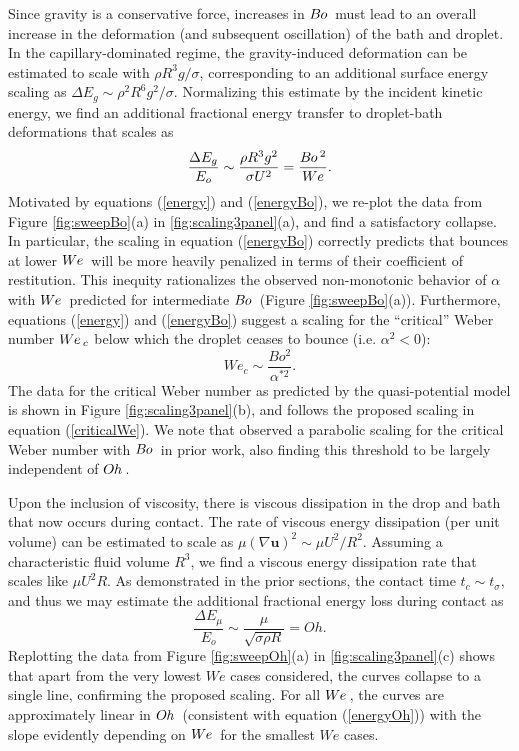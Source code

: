\documentclass{jfm}
\begin{document}
Since gravity is a conservative force, increases in $B\kern-0.04em o\,$ must lead to an overall increase in the deformation (and subsequent oscillation) of the bath and droplet.  In the capillary-dominated regime, the gravity-induced deformation can be estimated to scale with $\rho R^3 g/\sigma$, corresponding to an additional surface energy scaling as $\Delta E_g \sim \rho^2 R^6 g^2 / \sigma$.  Normalizing this estimate by the incident kinetic energy, we find an additional fractional energy transfer to droplet-bath deformations that scales as
\begin{equation}
    \frac{\Delta E_g}{E_o} \sim \frac{\rho R^3 g^2}{\sigma U^2}=\frac{B\kern-0.04em o\,^2}{We}.\label{energyBo}
\end{equation}
Motivated by equations (\ref{energy}) and (\ref{energyBo}), we re-plot the data from Figure \ref{fig:sweepBo}(a) in \ref{fig:scaling3panel}(a), and find a satisfactory collapse.  In particular, the scaling in equation (\ref{energyBo}) correctly predicts that bounces at lower $W\kern-0.03em e\,$ will be more heavily penalized in terms of their coefficient of restitution.  This inequity rationalizes the observed non-monotonic behavior of $\alpha$ with $W\kern-0.03em e\,$ predicted for intermediate $B\kern-0.04em o\,$ (Figure \ref{fig:sweepBo}(a)).
Furthermore, equations (\ref{energy}) and (\ref{energyBo}) suggest a scaling for the ``critical'' Weber number $W\kern-0.03em e\,_c$ below which the droplet ceases to bounce (i.e. $\alpha^2<0$):
\begin{equation}
    We_c \sim \frac{Bo^2}{\alpha^{*2}}.\label{criticalWe}
\end{equation}
The data for the critical Weber number as predicted by the quasi-potential model is shown in Figure \ref{fig:scaling3panel}(b), and follows the proposed scaling in equation (\ref{criticalWe}).  We note that \cite{blanchette2016modeling} observed a parabolic scaling for the critical Weber number with $B\kern-0.04em o\,$ in prior work, also finding this threshold to be largely independent of $O\kern-0.04em h\,$.

Upon the inclusion of viscosity, there is viscous dissipation in the drop and bath that now occurs during contact.  The rate of viscous energy dissipation (per unit volume) can be estimated to scale as $\mu (\nabla \mathbf{u})^2\sim \mu U^2 / R^2$.  Assuming a characteristic fluid volume $R^3$, we find a viscous energy dissipation rate that scales like $ \mu U^2 R$.  As demonstrated in the prior sections, the contact time $t_c \sim t_\sigma$, and thus we may estimate the additional fractional energy loss during contact as
\begin{equation}
    \frac{\Delta E_\mu}{E_o} \sim \frac{\mu}{\sqrt{\sigma \rho R}}=Oh.\label{energyOh}
\end{equation}
Replotting the data from Figure \ref{fig:sweepOh}(a) in \ref{fig:scaling3panel}(c) shows that apart from the very lowest $We$ cases considered, the curves collapse to a single line, confirming the proposed scaling.  For all $W\kern-0.03em e\,$, the curves are approximately linear in $O\kern-0.04em h\,$ (consistent with equation (\ref{energyOh})) with the slope evidently depending on $W\kern-0.03em e\,$ for the smallest $We$ cases.  
\end{document}
